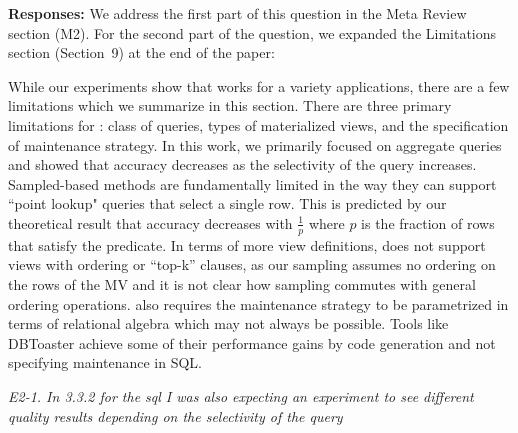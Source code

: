 {\bf Responses:} We address the first part of this question in the Meta Review section (M2). For the second part of the question, we expanded the Limitations section (Section~9) at the end of the paper:
\begin{displayquote}
While our experiments show that \svc works for a variety applications, there are a few limitations which we summarize in this section.
There are three primary limitations for \svc: class of queries, types of materialized views, and the specification of maintenance strategy.
In this work, we primarily focused on aggregate queries and showed that accuracy decreases as the selectivity of the query increases.
Sampled-based methods are fundamentally limited in the way they can support ``point lookup" queries that select a single row.
This is predicted by our theoretical result that accuracy decreases with $\frac{1}{p}$ where $p$ is the fraction of rows that satisfy the predicate.
In terms of more view definitions, \svc does not support views with ordering or ``top-k'' clauses, as our sampling assumes no ordering on the rows of the MV and it is not clear how sampling commutes with general ordering operations.
\svc also requires the maintenance strategy to be parametrized in terms of relational algebra which may not always be possible.
Tools like DBToaster achieve some of their performance gains by code generation and not specifying maintenance in SQL.
\end{displayquote}

\emph{E2-1. In 3.3.2 for the sql I was also expecting an experiment to see different quality results depending on the selectivity of the query}

\vspace{.25em}

